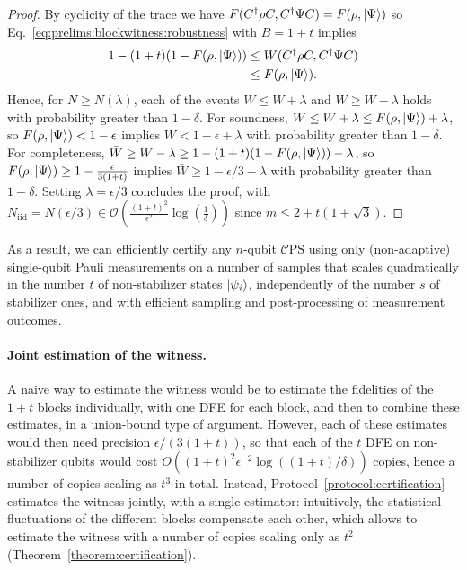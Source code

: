\documentclass[a4paper,twocolumn,11pt,unpublished]{../../revision/quantumarticle}
\newcommand{\Niid}{N_{\mathrm{iid}}}
\newcommand{\mCEPS}{\mathcal{C}\text{PS}}
\providecommand{\DIFadd}[1]{{\protect\color{blue} \sf #1}} %
\providecommand{\DIFaddbegin}{} %
\begin{document}
\begin{proof}
        By cyclicity of the trace we have $F(C^\dagger\rho C,C^\dagger\Psi C)=F(\rho,\ket\Psi)$ so Eq.~\eqref{eq:prelims:blockwitness:robustness} with $B=1+t$ implies
        \begin{equation}
            \begin{aligned}
            1-(1+t)(1-F(\rho,\ket\Psi)) &\leq W(C^\dagger\rho C,C^\dagger\Psi C)\\
            &\leq F(\rho,\ket\Psi).
            \end{aligned}
        \end{equation}
        Hence, for $N\ge N(\lambda)$, each of the events $\bar W \leq W + \lambda$ and $\bar W \geq W - \lambda$ holds with probability greater than $1-\delta$. For soundness, $\bar W \leq W+\lambda \leq F(\rho,\ket\Psi)+\lambda$, so $F(\rho,\ket\Psi)<1-\epsilon$ implies $\bar W<1-\epsilon+\lambda$ with probability greater than $1-\delta$. For completeness, $\bar W \geq W-\lambda \geq 1-(1+t)(1-F(\rho,\ket\Psi))-\lambda$, so $F(\rho,\ket\Psi)\ge1-\frac{\epsilon}{3(1+t)}$ implies $\bar W\ge1-\epsilon/3-\lambda$ with probability greater than $1-\delta$. Setting $\lambda=\epsilon/3$ concludes the proof, with $\Niid=N(\epsilon/3)\in\mathcal O(\frac{(1+t)^2}{\epsilon^2}\log(\frac{1}{\delta}))$ since $m\le 2+t(1+\sqrt3)$.
        \end{proof}
        As a result, we can efficiently certify any $n$-qubit $\mCEPS$ using only (non-adaptive) single-qubit Pauli measurements on a number of samples that scales quadratically in the number $t$ of non-stabilizer states $\ket{\psi_i}$, independently of the number $s$ of stabilizer ones, and with efficient sampling and post-processing of measurement outcomes.

        \DIFaddbegin \paragraph{\DIFadd{Joint estimation of the witness.}}
        \DIFadd{A naive way to estimate the witness would be to estimate the fidelities of the $1+t$ blocks individually, with one DFE for each block, and then to combine these estimates, in a union-bound type of argument. However, each of these estimates would then need precision $\epsilon/(3(1+t))$, so that each of the $t$ DFE on non-stabilizer qubits would cost $O((1+t)^2\epsilon^{-2}\log((1+t)/\delta))$ copies, hence a number of copies scaling as $t^3$ in total. Instead, Protocol~\ref{protocol:certification} estimates the witness jointly, with a single estimator: intuitively, the statistical fluctuations of the different blocks compensate each other, which allows to estimate the witness with a number of copies scaling only as $t^2$ (Theorem~\ref{theorem:certification}).
}
\end{document}
